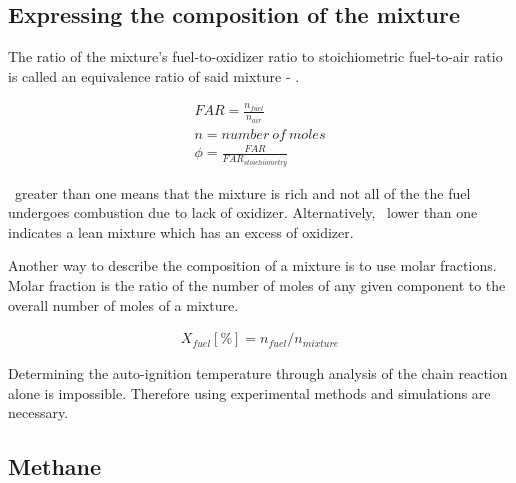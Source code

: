 \documentclass[a4paper,11pt]{article}
\begin{document}
    \subsection{Expressing the composition of the mixture}
    
    The ratio of the mixture's fuel-to-oxidizer ratio to stoichiometric fuel-to-air ratio is called an equivalence ratio of said mixture - \textPhi . \par 
     
     \begin{gather*}
    FAR = \frac{n_{fuel}}{n_{air}} \\
    n = number \ of \ moles \\
    \phi = \frac{FAR}{FAR_{stoichiometry}}
     \end{gather*}
     
      \textPhi \ greater than one means that the mixture is rich and not all of the the fuel undergoes combustion due to lack of oxidizer. Alternatively, \textPhi \ lower than one indicates a lean mixture which has an excess of oxidizer. \par 
      Another way to describe the composition of a mixture is to use molar fractions. Molar fraction is the ratio of the number of moles of any given component to the overall number of moles of a mixture. \par 
      
      \begin{gather*}
    X_{fuel} [\%] = n_{fuel}/n_{mixture}
     \end{gather*}
     
     Determining the auto-ignition temperature through analysis of the chain reaction alone is impossible. Therefore using experimental methods and simulations are necessary.
    
    \subsection{Methane}
    
\end{document}
